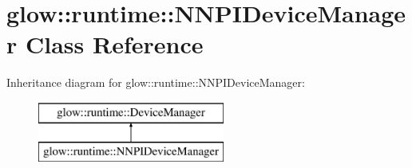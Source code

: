 \hypertarget{classglow_1_1runtime_1_1_n_n_p_i_device_manager}{}\section{glow\+:\+:runtime\+:\+:N\+N\+P\+I\+Device\+Manager Class Reference}
\label{classglow_1_1runtime_1_1_n_n_p_i_device_manager}
Inheritance diagram for glow\+:\+:runtime\+:\+:N\+N\+P\+I\+Device\+Manager\+:\begin{figure}[H]
\begin{center}
\leavevmode
\includegraphics[height=2.000000cm]{classglow_1_1runtime_1_1_n_n_p_i_device_manager}
\end{center}
\end{figure}
